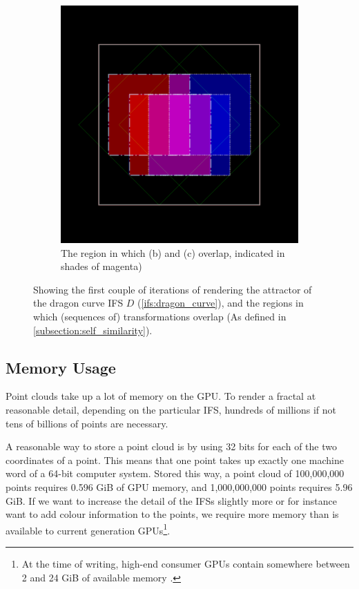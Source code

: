 \documentclass[11pt]{article}
\begin{document}
\begin{enumerate}
\begin{figure}
\begin{subfigure}[b]{0.4\textwidth}
         \includegraphics[width=\textwidth]{figures/dragon_curve_d}
         \caption{The region in which (b) and (c) overlap, indicated in shades of magenta)}
         \label{figure:dragon_curve_d}
         \vspace*{5mm}
     \end{subfigure}
        \caption{Showing the first couple of iterations of rendering the attractor of the dragon curve IFS $D$ (\autoref{ifs:dragon_curve}), and the regions in which (sequences of) transformations overlap (As defined in \autoref{subsection:self_similarity}).}
        \label{figure:dragon_curve_overlaps}
\end{figure}
\end{enumerate}

\subsection{Memory Usage}
\label{sec:orgad0c160}

Point clouds take up a lot of memory on the GPU. To render a fractal at reasonable detail, depending on the particular IFS,
hundreds of millions if not tens of billions of points are necessary.

A reasonable way to store a point cloud is by using 32 bits for each of the two coordinates of a point. 
This means that one point takes up exactly one machine word of a 64-bit computer system.
Stored this way, a point cloud of 100,000,000 points requires 0.596 GiB of GPU memory,
and 1,000,000,000 points requires 5.96 GiB.
If we want to increase the detail of the IFSs slightly more or for instance want to add colour information to the points,
we require more memory than is available to current generation GPUs\footnote{At the time of writing, high-end consumer GPUs contain somewhere between 2 and 24 GiB of available memory \cite{ign2020topgpus}.}.
\end{document}
